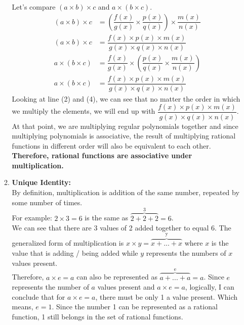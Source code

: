 \documentclass[12pt]{book}
\begin{document}
\begin{enumerate}
\begin{enumerate}
    Let's compare $(a \times b) \times c$ and $a \times (b \times c)$.
    \setcounter{equation}{0}
    \begingroup
    \addtolength{\jot}{0.5em}
    \begin{align}
        (a \times b) \times c &= \left(\dfrac{f(x)}{g(x)} \times \dfrac{p(x)}{q(x)}\right) \times \dfrac{m(x)}{n(x)}\\
        (a \times b) \times c &= \dfrac{f(x) \times p(x) \times m(x)}{g(x) \times q(x) \times n(x)}\\
        a \times (b \times c) &= \dfrac{f(x)}{g(x)} \times \left(\dfrac{p(x)}{q(x)} \times \dfrac{m(x)}{n(x)}\right)\\
        a \times (b \times c) &= \dfrac{f(x) \times p(x) \times m(x)}{g(x) \times q(x) \times n(x)}
    \end{align}
    \endgroup
    Looking at line (2) and (4), we can see that no matter the order in which we multiply the elements, we will end up with $\dfrac{f(x) \times p(x) \times m(x)}{g(x) \times q(x) \times n(x)}$. At that point, we are multiplying regular polynomials together and since multiplying polynomials is associative, the result of multiplying rational functions in different order will also be equivalent to each other. \\
    
    \textbf{Therefore, rational functions are associative under multiplication.}\\
    
    \item \textbf{Unique Identity:}\\
    By definition, multiplication is addition of the same number, repeated by some number of times.\\
    For example: $2 \times 3 = 6$ is the same as $\overbrace{2 + 2 + 2}^\text{3} = 6$.\\
    We can see that there are 3 values of 2 added together to equal 6. The generalized form of multiplication is $x \times y = \overbrace{x+...+x}^\text{y}$ where $x$ is the value that is adding / being added while $y$ represents the numbers of $x$ values present.\\
    Therefore, $a \times e = a$ can also be represented as $\overbrace{a+...+a}^\text{e} = a$. Since $e$ represents the number of $a$ values present and $a \times e = a$, logically, I can conclude that for $a \times e = a$, there must be only 1 a value present. Which means, $e = 1$. Since the number 1 can be represented as a rational function, 1 still belongs in the set of rational functions.\\
    

\end{enumerate}
\end{enumerate}
\end{document}
